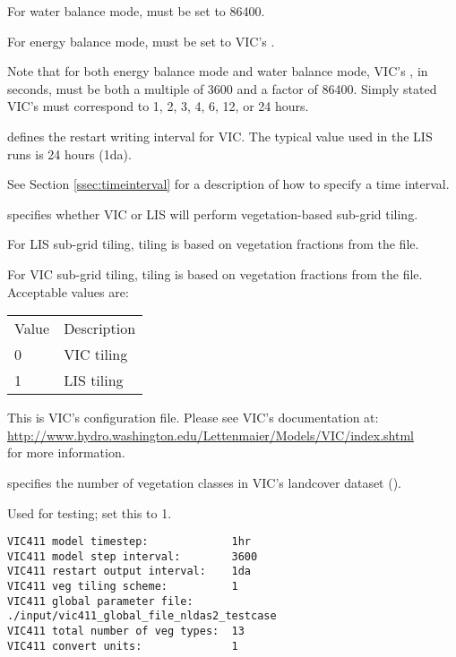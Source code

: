  For water balance mode, 
 must be set to 86400.

 For energy balance mode, 
 must be set to VIC's .

 Note that for both energy balance mode and water balance mode,
 VIC's , in seconds, must be both a
 multiple of 3600 and a factor of 86400.
 Simply stated VIC's  must
 correspond to 1, 2, 3, 4, 6, 12, or 24 hours.

  defines the restart
 writing interval for VIC. The typical value used in the
 LIS runs is 24 hours (1da).

 See Section \ref{ssec:timeinterval} for a description
 of how to specify a time interval.

  specifies whether VIC or LIS
 will perform vegetation-based sub-grid tiling.

 For LIS sub-grid tiling, tiling is based on vegetation fractions
 from the  file.

 For VIC sub-grid tiling, tiling is based on vegetation fractions
 from the  file.
 Acceptable values are:

 \begin{tabular}{ll}
 Value & Description \\
 0     & VIC tiling  \\
 1     & LIS tiling  \\
 \end{tabular}

  This is VIC's
 configuration file.  Please see VIC's documentation at: \\
 \hyperref{http://www.hydro.washington.edu/Lettenmaier/Models/VIC/index.shtml}{}{}{http://www.hydro.washington.edu/Lettenmaier/Models/VIC/index.shtml} \\
 for more information.

  specifies the
 number of vegetation classes in VIC's landcover dataset
 ().

  Used for testing; set this to 1.
 

 \begin{Verbatim}[frame=single]
VIC411 model timestep:             1hr
VIC411 model step interval:        3600
VIC411 restart output interval:    1da
VIC411 veg tiling scheme:          1
VIC411 global parameter file:      ./input/vic411_global_file_nldas2_testcase
VIC411 total number of veg types:  13
VIC411 convert units:              1
 \end{Verbatim}

